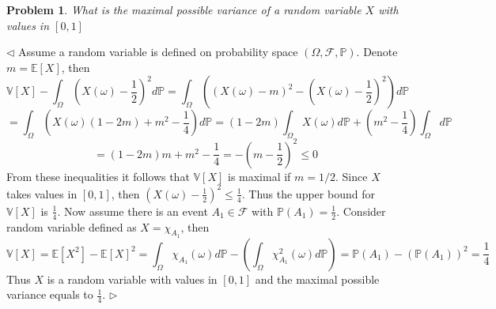 \documentclass[12pt]{article}
\newtheorem{problem}{Problem}[subsection]
\newenvironment{solution}{\par $\triangleleft$}{$\triangleright$}
\begin{document}
\begin{problem} What is the maximal possible variance of a random variable $X$
with values in $[0,1]$
\end{problem}
\begin{solution} Assume a random variable is defined on probability space
    $(\Omega,\mathcal{F},\mathbb{P})$. Denote $m=\mathbb{E}[X]$, then
    $$
        \mathbb{V}[X]-\int_{\Omega}
        {\left(X(\omega)-\frac{1}{2}\right)}^2 d\mathbb{P}
        =\int_{\Omega}\left({\left(X(\omega)-m\right)}^2-
        {\left(X(\omega)-\frac{1}{2}\right)}^2\right)d\mathbb{P}
    $$
    $$
        =\int_{\Omega}\left(X(\omega)(1-2m)+m^2-
        \frac{1}{4}\right)d\mathbb{P}
        =(1-2m)\int_{\Omega}X(\omega)d\mathbb{P}+
        \left(m^2-\frac{1}{4}\right)\int_{\Omega}d\mathbb{P}
    $$
    $$
        =(1-2m)m+m^2-\frac{1}{4}=
        -{\left(m-\frac{1}{2}\right)}^2\leq 0
    $$
    From these inequalities it follows that $\mathbb{V}[X]$ is maximal if
    $m=1/2$. Since $X$ takes values in $[0,1]$, then
    ${\left(X(\omega)-\frac{1}{2}\right)}^2\leq \frac{1}{4}$. Thus the upper
    bound for $\mathbb{V}[X]$ is $\frac{1}{4}$. Now assume there is an event
    $A_1\in\mathcal{F}$ with $\mathbb{P}(A_1)=\frac{1}{2}$. Consider random
    variable defined as $X=\chi_{A_1}$, then
    $$
        \mathbb{V}[X]
        =\mathbb{E}[X^2]-{\mathbb{E}[X]}^2
        =\int_{\Omega}\chi_{A_1}(\omega)d\mathbb{P}-
        \left(\int_{\Omega}\chi_{A_1}^2(\omega)d\mathbb{P}\right)
        =\mathbb{P}(A_1)-{(\mathbb{P}(A_1))}^2
        =\frac{1}{4}
    $$
    Thus $X$ is a random variable with values in $[0,1]$ and the maximal
    possible variance equals to $\frac{1}{4}$.
\end{solution}
\end{document}
